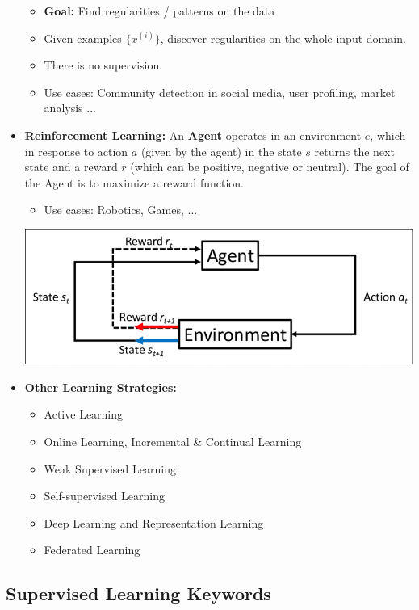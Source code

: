 \begin{itemize}
\begin{itemize}
        \item \textbf{Goal:} Find regularities / patterns on the data
        \item Given examples $\{x^{(i)}\}$, discover regularities on the whole input domain.
        \item There is no supervision.
        \item Use cases: Community detection in social media, user profiling, market analysis ...
    \end{itemize}    
    \item \textbf{Reinforcement Learning:}
    An \textbf{Agent} operates in an environment $e$, which in response to action $a$ (given by the agent) in the state $s$ returns the next state and a reward $r$ (which can be positive, negative or neutral).
    The goal of the Agent is to maximize a reward function.
    \begin{itemize}
        \item Use cases: Robotics, Games, ...
    \end{itemize}
    \begin{center}
        \includegraphics{images/Reinforcement learning.png}
    \end{center}
    \item \textbf{Other Learning Strategies:}
    \begin{itemize}
        \item Active Learning
        \item Online Learning, Incremental \& Continual Learning
        \item Weak Supervised Learning
        \item Self-supervised Learning
        \item Deep Learning and Representation Learning
        \item Federated Learning
    \end{itemize}
\end{itemize}

\subsection{Supervised Learning Keywords}


